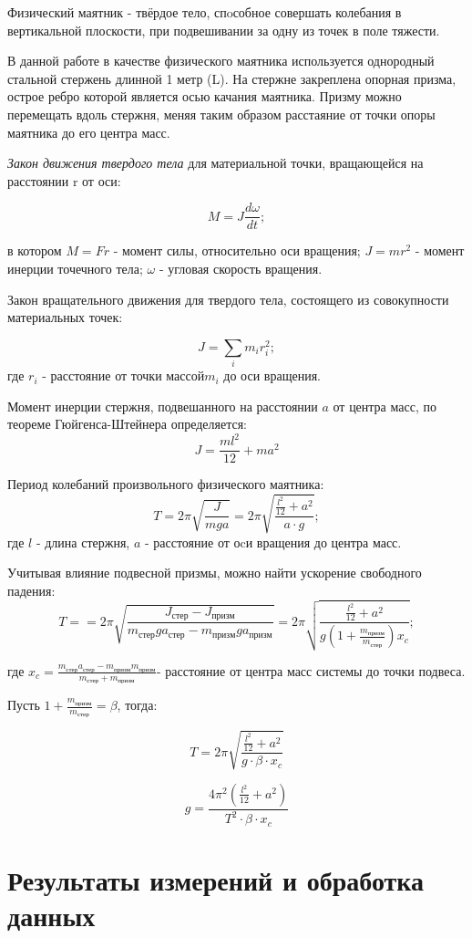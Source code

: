 \documentclass[a4paper,12pt]{article} %
\begin{document}
Физический маятник - твёрдое тело, спoсобное совершать колебания в вертикальной плоскости, при подвешивании за одну из точек в поле тяжести.

В данной работе в качестве физического маятника используется однородный стальной стержень длинной 1 метр (L). На стержне закреплена опорная призма, острое ребро которой является осью качания маятника. Призму можно перемещать вдоль стержня, меняя таким образом расстаяние от точки опоры маятника до его центра масс.


\textit{Закон движения твердого тела} для материальной точки, вращающейся на расстоянии r от оси:

\[ M = J\frac{d\omega}{dt};\]

в котором $M=Fr$ - момент силы, относительно оси вращения;
$ J= mr^2$ - момент инерции точечного тела;
$\omega$ - угловая скорость вращения.

Закон вращательного движения для твердого тела, состоящего из совокупности материальных точек:

\[ J = \sum\limits_{i}m_ir^2_i;\]
где $r_i$ - расстояние от точки массой$m_i$ до оси вращения.

Момент инерции стержня, подвешанного на расстоянии $a$ от центра масс, по теореме Гюйгенса-Штейнера определяется:
\[J=\frac{ml^2}{12}+ma^2\]

Период колебаний произвольного физического маятника:
\[ T= 2\pi \sqrt{\frac{J}{mga}}=2\pi \sqrt{\frac{\frac{l^2}{12}+ a^2}{a \cdot g }}; \]
где $l$ - длина стержня, $a$ - расстояние от оcи вращения до центра масс.

Учитывая влияние подвесной призмы, можно найти ускорение свободного падения:
\[T == 2 \pi \sqrt{\frac{J_{стер}-J_{призм}}{m_{стер}ga_{стер}-m_{призм}ga_{призм}}}= 2\pi \sqrt{\frac{\frac{l^2}{12}+a^2}{g(1+\frac{m_{призм}}{m_{стер}})x_{c}}};\]

где $x_c=\frac{m_{стер}a_{стер}-m_{призм}m_{призм}}{m_{стер}+m_{призм}}$- расстояние от центра масс системы до точки подвеса.

Пусть $1+\frac{m_{призм}}{m_{стер}} = \beta$, тогда:

\[ T= 2\pi \sqrt{\frac{\frac{l^2}{12}+a^2}{g\cdot \beta \cdot x_c}}\]

\[ g = \frac{4\pi ^ 2(\frac{l^2}{12}+a^2)}{T^2 \cdot \beta \cdot x_c}\]

 

\newpage
\section*{Результаты измерений и обработка данных}
\end{document}
